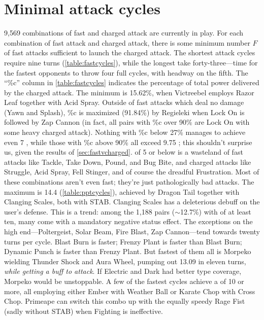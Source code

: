 \section{Minimal attack cycles\label{sec:minimalcycles}}
9,569 combinations of fast and charged attack are currently in play.
For each combination of fast attack and charged attack, there is some minimum number
 $F$ of fast attacks sufficient to launch the charged attack.
The shortest attack cycles require nine turns (\autoref{table:fastcycles}),
 while the longest take forty-three---time for the fastest opponents to
 throw four full cycles, with headway on the fifth.
The ``\%c'' column in \autoref{table:fastcycles} indicates the percentage of total
 power delivered by the charged attack.
The minimum is 15.62\%, when Victreebel employs Razor Leaf together with Acid Spray.
Outside of fast attacks which deal no damage (Yawn and Splash), \%c is maximized (91.84\%)
 by Regieleki when Lock On is followed by Zap Cannon
 (in fact, all pairs with \%c over 90\% are Lock On with some heavy charged attack).
Nothing with \%c below 27\% manages to achieve even 7 \PPT{}, while
 those with \%c above 90\% all exceed 9.75 \PPT{}; this shouldn't surprise
 us, given the results of \autoref{sec:fastvcharged}.
\PPT{} of 5 or below is a wasteland of fast attacks like Tackle, Take Down, Pound, and Bug Bite,
 and charged attacks like Struggle, Acid Spray, Fell Stinger, and of course the dreadful Frustration.
Most of these combinations aren't even fast; they're just pathologically bad attacks.
The maximum \PPT{} is 14.4 (\autoref{table:pptcycles}), achieved by Dragon Tail together with Clanging Scales, both with STAB\@.
Clanging Scales has a deleterious debuff on the user's defense.
This is a trend: among the 1,188 pairs ($\sim$12.7\%) with \PPT{} of at least ten,
 many come with a mandatory negative status effect.
The exceptions on the high end---Poltergeist, Solar Beam, Fire Blast, Zap Cannon---tend towards twenty turns per cycle.
Blast Burn is faster; Frenzy Plant is faster than Blast Burn; Dynamic Punch is faster than Frenzy Plant.
But fastest of them all is Morpeko wielding Thunder Shock and Aura Wheel, pumping out 13.09 \PPT{}
 in eleven turns, \textit{while getting a buff to attack}.
If Electric and Dark had better type coverage, Morpeko would be unstoppable.
A few of the fastest cycles achieve a \PPT{} of 10 or more, all employing either Ember with Weather Ball or Karate Chop with Cross Chop.
Primeape can switch this combo up with the equally speedy Rage Fist (sadly without STAB) when Fighting is ineffective.

